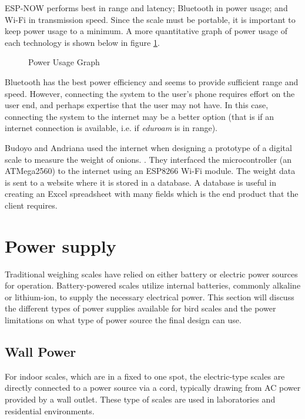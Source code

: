 \documentclass[class=report,11pt,crop=false]{standalone}
\begin{document}
ESP-NOW performs best in range and latency; Bluetooth in power usage; and Wi-Fi in transmission speed. Since the scale must be portable, it is important to keep power usage to a minimum. 
A more quantitative graph of power usage of each technology is shown below in figure \ref{fig:power-usage}.

\begin{figure}[h!]
	\centering
	\caption{Power Usage Graph}
	\label{fig:power-usage}
\end{figure}

Bluetooth has the best power efficiency and seems to provide sufficient range and speed.
However, connecting the system to the user's phone requires effort on the user end, and perhaps expertise that the user may not have. In this case, connecting the system to the internet may be a better option (that is if an internet connection is available, i.e. if \textit{eduroam} is in range). 

Budoyo and Andriana used the internet when designing a prototype of a digital scale to measure the weight of onions. \cite{iot}. They interfaced the microcontroller (an  ATMega2560) to the internet using an ESP8266 Wi-Fi module. The weight data is sent to a website where it is stored in a database. A database is useful in creating an Excel spreadsheet with many fields which is the end product that the client requires.

\section{Power supply}	
Traditional weighing scales have relied on either battery or electric power sources for operation. Battery-powered scales utilize internal batteries, commonly alkaline or lithium-ion, to supply the necessary electrical power. This section will discuss the different types of power supplies available for bird scales and the power limitations on what type of power source the final design can use.

\subsection{Wall Power}
For indoor scales, which are in a fixed to one spot, the electric-type scales are directly connected to a power source via a cord, typically drawing from AC power provided by a wall outlet. These type of scales are used in laboratories and residential environments. 
\end{document}
